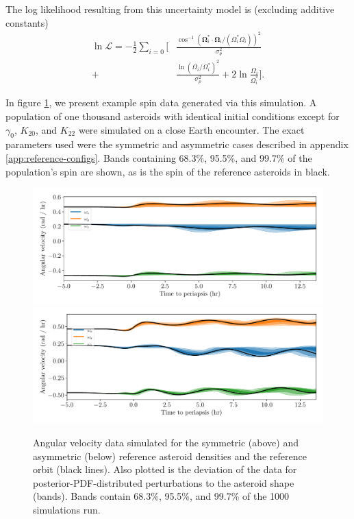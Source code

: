 \documentclass[fleqn,usenatbib]{mnras}
\newcommand{\parens}[1]{\left( #1 \right)}
\begin{document}
The log likelihood resulting from this uncertainty model is (excluding additive constants)
\begin{equation}
  \begin{split}
  \ln \mathcal{L} = -\frac{1}{2}\sum_{i = 0}\Bigg[&\frac{\cos^{-1} (\bm \Omega_i^* \cdot \bm \Omega_i/(\Omega_i^* \Omega_i))^2}{\sigma_\theta^2}\\
  +&\frac{\ln \parens{\Omega_i /\Omega_i^*}^2}{\sigma_\rho^2} + 2\ln\frac{\Omega_i}{\Omega_i^*}\Bigg].
  \end{split}
  \label{eqn:log-likelihood}
\end{equation}

In figure \ref{fig:example-data}, we present example spin data generated via this simulation. A population of one thousand asteroids with identical initial conditions except for $\gamma_0$, $K_{20}$, and $K_{22}$ were simulated on a close Earth encounter. The exact parameters used were the symmetric and asymmetric cases described in appendix \ref{app:reference-configs}. Bands containing 68.3\%, 95.5\%, and 99.7\% of the population's spin are shown, as is the spin of the reference asteroids in black.

\begin{figure}
  \centering
  \includegraphics[width=0.7\linewidth]{figs/nominal-data-sym.pdf}
  \includegraphics[width=0.7\linewidth]{figs/nominal-data-asym.pdf}
  \caption{Angular velocity data simulated for the symmetric (above) and asymmetric (below) reference asteroid densities and the reference orbit (black lines). Also plotted is the deviation of the data for posterior-PDF-distributed perturbations to the asteroid shape (bands). Bands contain 68.3\%, 95.5\%, and 99.7\% of the 1000 simulations run.}
  \label{fig:example-data}
\end{figure}
\end{document}
